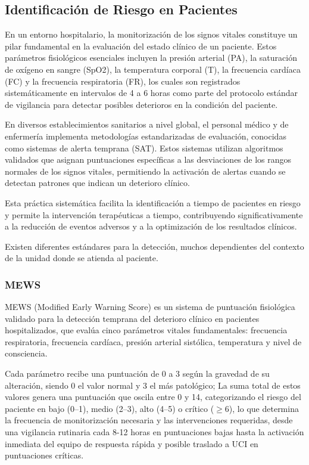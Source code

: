 \subsection{Identificación de Riesgo en Pacientes}

En un entorno hospitalario, la monitorización de los signos vitales constituye un pilar fundamental en la evaluación del estado clínico de un paciente. 
Estos parámetros fisiológicos esenciales incluyen la presión arterial (PA), la saturación de oxígeno en sangre (SpO2), la temperatura corporal (T), 
la frecuencia cardíaca (FC) y la frecuencia respiratoria (FR), los cuales son registrados sistemáticamente en intervalos de 4 a 6 horas 
como parte del protocolo estándar de vigilancia para detectar posibles deterioros en la condición del paciente.

En diversos establecimientos sanitarios a nivel global, el personal médico y de enfermería implementa metodologías estandarizadas de evaluación, 
conocidas como sistemas de alerta temprana (SAT). 
Estos sistemas utilizan algoritmos validados que asignan puntuaciones específicas a las desviaciones de los rangos normales de los signos vitales, 
permitiendo la activación de alertas cuando se detectan patrones que indican un deterioro clínico. 

Esta práctica sistemática facilita la identificación a tiempo de pacientes en riesgo y permite la intervención terapéuticas a tiempo, 
contribuyendo significativamente a la reducción de eventos adversos y a la optimización de los resultados clínicos.

Existen diferentes estándares para la detección, muchos dependientes del contexto de la unidad donde se atienda al paciente. \parencite{rpm_pm}

\subsubsection{MEWS}
MEWS (Modified Early Warning Score) es un sistema de puntuación fisiológica validado para la detección temprana del deterioro clínico en pacientes hospitalizados, 
que evalúa cinco parámetros vitales fundamentales: frecuencia respiratoria, frecuencia cardíaca, presión arterial sistólica, temperatura 
y nivel de consciencia. 

Cada parámetro recibe una puntuación de 0 a 3 según la gravedad de su alteración, siendo 0 el valor normal y 3 el más patológico; 
La suma total de estos valores genera una puntuación que oscila entre 0 y 14, categorizando el riesgo del paciente en bajo (0--1), medio (2--3), alto (4--5) o crítico ($\geq$6), 
lo que determina la frecuencia de monitorización necesaria y las intervenciones requeridas, 
desde una vigilancia rutinaria cada 8-12 horas en puntuaciones bajas hasta la activación inmediata del equipo de respuesta rápida y posible traslado a UCI en puntuaciones críticas.

